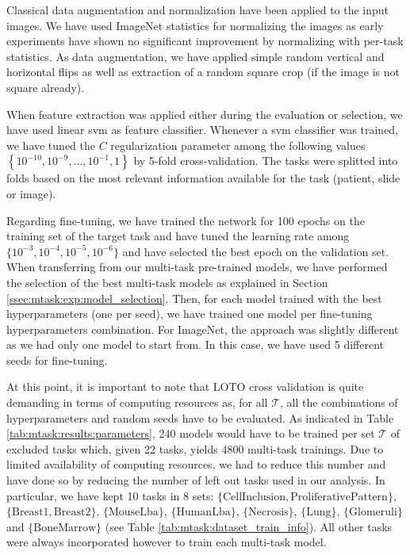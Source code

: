 Classical data augmentation and normalization have been applied to the input images. We have used ImageNet statistics for normalizing the images as early experiments have shown no significant improvement by normalizing with per-task statistics. As data augmentation, we have applied simple random vertical and horizontal flips as well as extraction of a random square crop (if the image is not square already).

When feature extraction was applied either during the evaluation or selection, we have used linear \acrshort{svm} \parencite{fan2008liblinear} as feature classifier. Whenever a \acrshort{svm} classifier was trained, we have tuned the $C$ regularization parameter among the following values $\left\{10^{-10}, 10^{-9},...,10^{-1},1\right\}$ by 5-fold cross-validation. The tasks were splitted into folds based on the most relevant information available for the task (patient, slide or image).

Regarding fine-tuning, we have trained the network for 100 epochs on the training set of the target task and have tuned the learning rate among $\{10^{-3}, 10^{-4}, 10^{-5}, 10^{-6}\}$ and have selected the best epoch on the validation set. When transferring from our multi-task pre-trained models, we have performed the selection of the best multi-task models as explained in Section \ref{ssec:mtask:exp:model_selection}. Then, for each model trained with the best hyperparameters (\ie one per seed), we have trained one model per fine-tuning hyperparameters combination. For ImageNet, the approach was slightly different as we had only one model to start from. In this case, we have used 5 different seeds for fine-tuning. 

At this point, it is important to note that LOTO cross validation is quite demanding in terms of computing resources as, for all $\mathcal{T}$, all the combinations of hyperparameters and random seeds have to be evaluated. As indicated in Table \ref{tab:mtask:results:parameters}, 240 models would have to be trained per set $\mathcal{T}$ of excluded tasks which, given 22 tasks, yields 4800 multi-task trainings. Due to limited availability of computing resources, we had to reduce this number and have done so by reducing the number of left out tasks used in our analysis. In particular, we have kept 10 tasks in 8 sets: $\{\text{CellInclusion}, \text{ProliferativePattern}\}$, $\{\text{Breast1}, \text{Breast2}\}$, $\{\text{MouseLba}\}$, $\{\text{HumanLba}\}$, $\{\text{Necrosis}\}$, $\{\text{Lung}\}$, $\{\text{Glomeruli}\}$ and $\{\text{BoneMarrow}\}$ (see Table \ref{tab:mtask:dataset_train_info}). All other tasks were always incorporated however to train each multi-task model.

